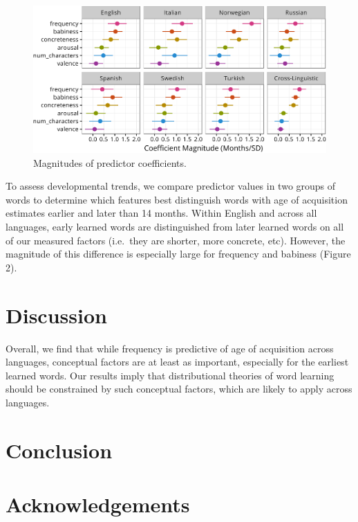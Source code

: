 \documentclass[10pt, letterpaper]{article}
\newenvironment{CodeChunk}{}{}
\begin{document}
\begin{CodeChunk}
\begin{figure}[tb]

{\centering \includegraphics{figs/coefs-1} 

}

\caption[Magnitudes of predictor coefficients]{Magnitudes of predictor coefficients.}\label{fig:coefs}
\end{figure}
\end{CodeChunk}

To assess developmental trends, we compare predictor values in two
groups of words to determine which features best distinguish words with
age of acquisition estimates earlier and later than 14 months. Within
English and across all languages, early learned words are distinguished
from later learned words on all of our measured factors (i.e.~they are
shorter, more concrete, etc). However, the magnitude of this difference
is especially large for frequency and babiness (Figure 2).

\section{Discussion}\label{discussion}

Overall, we find that while frequency is predictive of age of
acquisition across languages, conceptual factors are at least as
important, especially for the earliest learned words. Our results imply
that distributional theories of word learning should be constrained by
such conceptual factors, which are likely to apply across languages.

\section{Conclusion}\label{conclusion}

\section{Acknowledgements}\label{acknowledgements}
\end{document}
